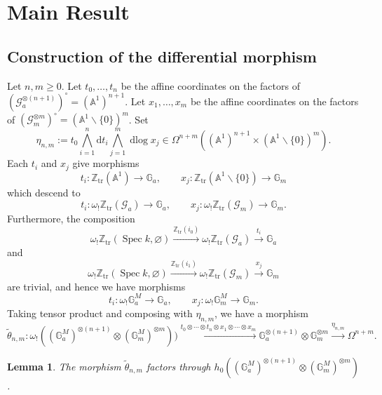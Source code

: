 \documentclass[a4paper,12pt,reqno]{amsart}
\numberwithin{equation}{section}
\newtheorem{lem}[lem]{Lemma}
\theoremstyle{definition}
\newcommand{\Z}{\mathbb{Z}}
\newcommand{\bA}{\mathbb{A}}
\DeclareMathOperator{\dlog}{dlog}
\DeclareMathOperator{\Spec}{Spec}
\newcommand{\Gm}{\mathbb{G}_{m}}
\newcommand{\Ga}{\mathbb{G}_{a}}
\renewcommand{\d}{\mathrm{d}}
\newcommand{\black}{\color{black}}
\newcommand{\Ztr}{\Z_{\mathrm{tr}}}
\newcommand{\GaMod}{\mathbb{G}_{a}^{M}}
\newcommand{\GmMod}{\mathbb G_m^M}
\newcommand{\Gapair}{\mathcal{G}_a}
\newcommand{\Gmpair}{\mathcal{G}_m}
\begin{document}
\section{Main Result}%
\label{sec:diff}

\subsection{Construction of the differential morphism}
Let $n, m\geq0$.  
Let $t_0,\ldots,t_n$ be the
affine coordinates on the factors of $(\Gapair^{\otimes(n+1)})^\circ = (\bA^1)^{n+1}$.
Let $x_1,\ldots, x_m$ be the
affine coordinates on the factors of $(\Gmpair^{\otimes m})^\circ = (\bA^1\smallsetminus\{0\})^{m}$.
Set
\begin{equation}\label{eq:eta}
 \eta_{n,m}:=
 t_0
 \bigwedge_{i=1}^n\d t_i
 \bigwedge_{j=1}^m\dlog x_j
 \in\Omega^{n+m}((\mathbb A^1)^{n+1}\times (\bA^1\smallsetminus\{0\})^m).
\end{equation}\black
Each $t_i$ and $x_j$ give morphisms
\[
t_i:\Ztr(\bA^1)\to \Ga,\qquad x_j:\Ztr(\bA^1\smallsetminus\{0\})\to \Gm
\]
which descend to 
\[
t_i:\omega_!\Ztr(\Gapair) \to \Ga,\qquad
x_j:\omega_!\Ztr(\Gmpair) \to \Gm.
\]
Furthermore, the composition
\[
\omega_!\Ztr(\Spec k, \varnothing)\xrightarrow{\Ztr(i_0)} \omega_!\Ztr(\Gapair) \xrightarrow{t_i} \Ga
\]
and
\[
\omega_!\Ztr(\Spec k, \varnothing)\xrightarrow{\Ztr(i_1)} \omega_!\Ztr(\Gmpair) \xrightarrow{x_j} \Gm
\]
are trivial, and hence we have morphisms
\[
t_i:\omega_!\GaMod \to \Ga, \qquad 
x_j:\omega_!\GmMod \to \Gm.
\]
Taking tensor product and composing with $\eta_{n,m}$, we have a morphism 
\[
\widetilde{\theta}_{n,m}: \omega_!((\GaMod)^{\otimes (n+1)}\otimes (\GmMod)^{\otimes m}))\xrightarrow{t_0\otimes \cdots \otimes t_n\otimes x_1\otimes\cdots\otimes x_m} \Ga^{\otimes (n+1)}\otimes \Gm^{\otimes m}\xrightarrow{\eta_{n,m}} \Omega^{n+m}.
\]
\begin{lem}\label{lem:thetaS}
    The morphism $\widetilde{\theta}_{n,m}$ factors through $h_0((\GaMod)^{\otimes (n+1)}\otimes (\GmMod)^{\otimes m})$.
\end{lem}
\end{document}
